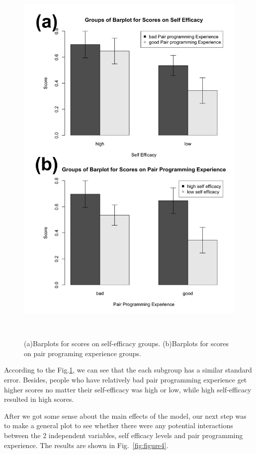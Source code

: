 \documentclass{sigchi}
\begin{document}
\begin{figure}
\centering
  \includegraphics[width=0.6\columnwidth]{figures/fig3}
  \caption{(a)Barplots for scores on self-efficacy groups. (b)Barplots for scores on pair programing experience groups.}~\label{fig:figure3}
\end{figure}

According to the Fig.\ref{fig:figure3}, we can see that the each subgroup has a similar standard error. Besides, people who have relatively bad pair programming experience get higher scores no matter their self-efficacy was high or low, while high self-efficacy resulted in high scores. 

After we got some sense about the main effects of the model, our next step was to make a general plot to see whether there were any potential interactions between the 2 independent variables, self efficacy levels and pair programming experience. The results are shown in Fig.~\ref{fig:figure4}.
\end{document}
